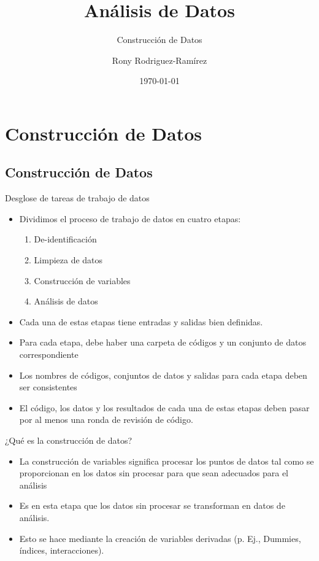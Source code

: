 \documentclass[10pt, aspectratio=169, compress]{beamer}
\title{Análisis de Datos}
\subtitle{Construcción de Datos}
\author{Rony Rodriguez-Ramírez}
\institute{LAMBDA}
\date{\today}
\begin{document}
\begin{frame}[plain]
	\maketitle 
\end{frame}
\section{Construcción de Datos}
\subsection{Construcción de Datos}
\begin{frame}{Desglose de tareas de trabajo de datos}
	\begin{itemize}
		\item Dividimos el proceso de trabajo de datos en cuatro etapas:
		\begin{enumerate}
			\item De-identificación
			\item Limpieza de datos
			\item Construcción de variables
			\item Análisis de datos
		\end{enumerate}
		\item Cada una de estas etapas tiene entradas y salidas bien definidas.
		\item Para cada etapa, debe haber una carpeta de códigos y un conjunto de datos correspondiente
		\item Los nombres de códigos, conjuntos de datos y salidas para cada etapa deben ser consistentes
		\item El código, los datos y los resultados de cada una de estas etapas deben pasar por al menos una ronda de revisión de código.
	\end{itemize}
\end{frame}
\begin{frame}[t]{¿Qué es la construcción de datos?}
	\begin{itemize}
		\item La construcción de variables significa procesar los puntos de datos tal como se proporcionan en los datos sin procesar para que sean adecuados para el análisis
		\item Es en esta etapa que los datos sin procesar se transforman en datos de análisis.
		\item Esto se hace mediante la creación de variables derivadas (p. Ej., Dummies, índices, interacciones).
	\end{itemize}
\end{frame}
\end{document}
